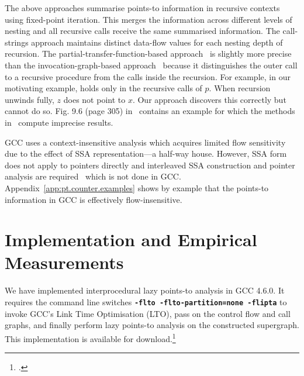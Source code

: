 \documentclass{llncs}
\newcommand{\pt}[2]{\text{$(#1,#2)$}}
\begin{document}
The above approaches summarise points-to information in recursive contexts
using fixed-point iteration.
This merges the information across different levels
of nesting and all recursive calls receive the same summarised
information.
The call-strings approach maintains distinct data-flow values for
each nesting depth of recursion. 
The partial-transfer-function-based approach~\cite{Wilson.RP.Lam.MS:1995:Efficient-Context-Sensitive-Pointer}
is slightly more precise than the invocation-graph-based 
approach~\cite{Emami.M.Ghiya.R.Hendren.LJ:1994:Context-sensitive-interprocedural-points-to}
because it distinguishes the outer call to a recursive procedure
from the calls inside the recursion. For example, in our motivating
example, \pt{z}{x} holds only in the recursive calls of $p$.
When recursion unwinds fully, $z$ does not point to $x$. Our approach
discovers this correctly but~\cite{Emami.M.Ghiya.R.Hendren.LJ:1994:Context-sensitive-interprocedural-points-to}
cannot do so. Fig. 9.6 (page 305) in~\cite{Khedker.U.Sanyal.A.Karkare.B:2009:Data-Flow-Analysis}
contains an example for which the methods 
in~\cite{Wilson.RP.Lam.MS:1995:Efficient-Context-Sensitive-Pointer,Emami.M.Ghiya.R.Hendren.LJ:1994:Context-sensitive-interprocedural-points-to}
compute imprecise results.

GCC uses a context-insensitive analysis which acquires limited
flow sensitivity due to the effect of SSA representation---a half-way house.
However, SSA form does not apply to 
pointers directly and interleaved SSA construction and pointer analysis
are required~\cite{Hasti.R.Horwitz.S:1998:Using-static-single} which is not
done in GCC\@.
Appendix~\ref{app:pt.counter.examples} shows by example that
the points-to information in GCC is effectively flow-insensitive.




\section{Implementation and Empirical Measurements}
\label{sec:measurements}

We have implemented interprocedural lazy points-to analysis in GCC 4.6.0.
It requires the command line switches 
{\tt\bfseries -flto -flto-partition=none -flipta}
to invoke GCC's Link Time Optimisation (LTO), pass on the control
flow and call graphs, and finally perform lazy points-to analysis on
the constructed supergraph. This implementation 
is available for download.\footnote{.}
\end{document}
